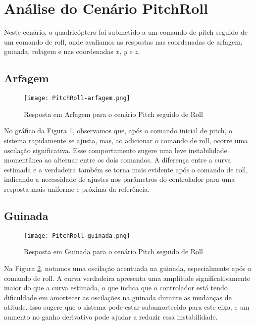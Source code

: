 \section{Análise do Cenário PitchRoll}

Neste cenário, o quadricóptero foi submetido a um comando de pitch seguido de um comando de roll, onde avaliamos as respostas nas coordenadas de arfagem, guinada, rolagem e nas coordenadas \(x\), \(y\) e \(z\).

\subsection{Arfagem}

\begin{figure}[H]
    \centering
    \texttt{[image: PitchRoll-arfagem.png]}
    \caption{Resposta em Arfagem para o cenário Pitch seguido de Roll}
    \label{fig:pitchroll-arfagem}
\end{figure}

No gráfico da Figura \ref{fig:pitchroll-arfagem}, observamos que, após o comando inicial de pitch, o sistema rapidamente se ajusta, mas, ao adicionar o comando de roll, ocorre uma oscilação significativa. Esse comportamento sugere uma leve instabilidade momentânea ao alternar entre os dois comandos. A diferença entre a curva estimada e a verdadeira também se torna mais evidente após o comando de roll, indicando a necessidade de ajustes nos parâmetros do controlador para uma resposta mais uniforme e próxima da referência.

\subsection{Guinada}

\begin{figure}[H]
    \centering
    \texttt{[image: PitchRoll-guinada.png]}
    \caption{Resposta em Guinada para o cenário Pitch seguido de Roll}
    \label{fig:pitchroll-guinada}
\end{figure}

Na Figura \ref{fig:pitchroll-guinada}, notamos uma oscilação acentuada na guinada, especialmente após o comando de roll. A curva verdadeira apresenta uma amplitude significativamente maior do que a curva estimada, o que indica que o controlador está tendo dificuldade em amortecer as oscilações na guinada durante as mudanças de atitude. Isso sugere que o sistema pode estar subamortecido para este eixo, e um aumento no ganho derivativo pode ajudar a reduzir essa instabilidade.

